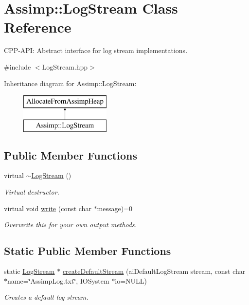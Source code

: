 \hypertarget{class_assimp_1_1_log_stream}{}\section{Assimp\+:\+:Log\+Stream Class Reference}
\label{class_assimp_1_1_log_stream}


C\+P\+P-\/\+A\+PI\+: Abstract interface for log stream implementations.  




{\ttfamily \#include $<$Log\+Stream.\+hpp$>$}

Inheritance diagram for Assimp\+:\+:Log\+Stream\+:\begin{figure}[H]
\begin{center}
\leavevmode
\includegraphics[height=2.000000cm]{class_assimp_1_1_log_stream}
\end{center}
\end{figure}
\subsection*{Public Member Functions}
\begin{DoxyCompactItemize}
\item 
virtual \hyperlink{class_assimp_1_1_log_stream_a72cabcadc78dcbdd54b5641703057ee7}{$\sim$\+Log\+Stream} ()\hypertarget{class_assimp_1_1_log_stream_a72cabcadc78dcbdd54b5641703057ee7}{}\label{class_assimp_1_1_log_stream_a72cabcadc78dcbdd54b5641703057ee7}

\begin{DoxyCompactList}\small\item\em Virtual destructor. \end{DoxyCompactList}\item 
virtual void \hyperlink{class_assimp_1_1_log_stream_ab0bfcb5ab9988ef65d7222a50f6e8d37}{write} (const char $\ast$message)=0
\begin{DoxyCompactList}\small\item\em Overwrite this for your own output methods. \end{DoxyCompactList}\end{DoxyCompactItemize}
\subsection*{Static Public Member Functions}
\begin{DoxyCompactItemize}
\item 
static \hyperlink{class_assimp_1_1_log_stream}{Log\+Stream} $\ast$ \hyperlink{class_assimp_1_1_log_stream_a6b358a4a79b2e9ba2025e10d3e9405e3}{create\+Default\+Stream} (ai\+Default\+Log\+Stream stream, const char $\ast$name=\char`\"{}Assimp\+Log.\+txt\char`\"{}, I\+O\+System $\ast$io=N\+U\+LL)
\begin{DoxyCompactList}\small\item\em Creates a default log stream. \end{DoxyCompactList}\end{DoxyCompactItemize}
